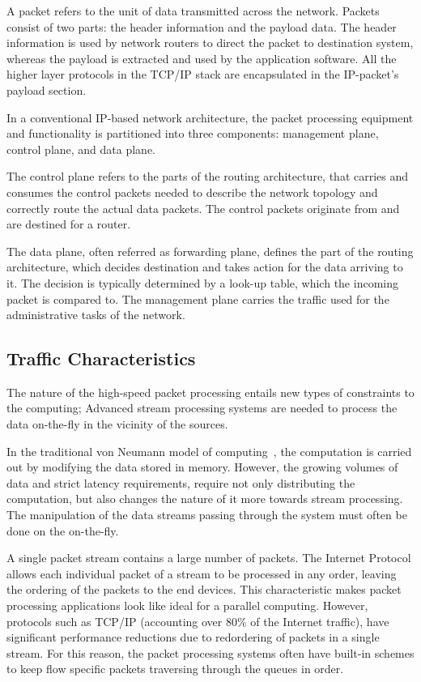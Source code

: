 A packet refers to the unit of data transmitted across the network. Packets consist of two parts: the header information and the payload data. The header information is used by network routers to direct the packet to destination system, whereas the payload is extracted and used by the application software. All the higher layer protocols in the TCP/IP stack are encapsulated in the IP-packet's payload section.~\cite{Deering:1998:Internet}

In a conventional IP-based network architecture, the packet processing equipment and functionality is partitioned into three components: management plane, control plane, and data plane.~\cite{Chao:2007:HPS}

The control plane refers to the parts of the routing architecture, that carries and consumes the control packets needed to describe the network topology and correctly route the actual data packets. The control packets originate from and are destined for a router.~\cite{Chao:2007:HPS, Yang:2004:FCE}

The data plane, often referred as forwarding plane, defines the part of the routing architecture, which decides destination and takes action for the data arriving to it. The decision is typically determined by a look-up table, which the incoming packet is compared to. The management plane carries the traffic used for the administrative tasks of the network.~\cite{Chao:2007:HPS, Yang:2004:FCE}

\subsection{Traffic Characteristics}
The nature of the high-speed packet processing entails new types of constraints to the computing; Advanced stream processing systems are needed to process the data on-the-fly in the vicinity of the sources.~\cite{Bonomi:2012:Fog}

In the traditional von Neumann model of computing~\cite{Neumann:1993:EDVAC}, the computation is carried out by modifying the data stored in memory. However, the growing volumes of data and strict latency requirements, require not only distributing the computation, but also changes the nature of it more towards stream processing. The manipulation of the data streams passing through the system must often be done on the on-the-fly.~\cite{Bonomi:2012:Fog, Thies:2002:StreamIt}

A single packet stream contains a large number of packets. The Internet Protocol allows each individual packet of a stream to be processed in any order, leaving the ordering of the packets to the end devices. This characteristic makes packet processing applications look like ideal for a parallel computing. However, protocols such as TCP/IP (accounting over 80\% of the Internet traffic), have significant performance reductions due to redordering of packets in a single stream. For this reason, the packet processing systems often have built-in schemes to keep flow specific packets traversing through the queues in order.

